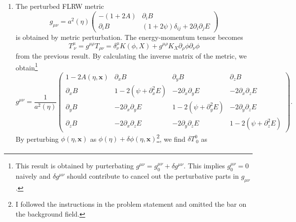\documentclass[a4paper,pdftex,10pt]{article}
\begin{document}
\begin{enumerate}
  \item
        The perturbed FLRW metric
        \begin{equation}
          g_{\mu\nu}
          =
          a^2(\eta)
          \begin{pmatrix}
            -(1+2A)       & \partial_{i}B                                   \\
            \partial_{i}B & (1+2\psi)\delta_{ij}+2\partial_{i}\partial_{j}E
          \end{pmatrix}
        \end{equation}
        is obtained by metric perturbation. The energy-momentum tensor becomes
        \begin{equation}
          T^{\mu}_{\ \nu}
          =
          g^{\mu\rho}T_{\rho\nu}
          =
          \delta^{\mu}_{\nu}K(\phi,X)
          +
          g^{\mu\rho}
          K_{X}
          \partial_{\rho}\phi\partial_{\nu}\phi
          \label{eqn:upperd_energy-momentum_tensor}
        \end{equation}
        from the previous result. By calculating the inverse matrix of the metric, we obtain\footnote{
          This result is obtained by purterbating $g^{\mu\nu}=g_{0}^{\mu\nu}+\delta g^{\mu\nu}$. This implies $g_{0}^{\mu\nu}=0$ naively and $\delta g^{\mu\nu}$ should contribute to cancel out the perturbative parts in $g_{\mu\nu}$.
        }
        \begin{equation}
          g^{\mu\nu}
          =
          \frac{1}{a^2(\eta)}
          \begin{pmatrix}
            1-2A(\eta,\bm{x}) & \partial_{x}B & \partial_{y}B & \partial_{z}B \\
            \partial_{x}B & 1-2(\psi+\partial_{x}^{2}E) & -2\partial_{x}\partial_{y}E & -2\partial_{x}\partial_{z}E \\
            \partial_{y}B & -2\partial_{x}\partial_{y}E & 1-2(\psi+\partial_{y}^{2}E) & -2\partial_{y}\partial_{z} E \\
            \partial_{z}B & -2\partial_{x}\partial_{z}E & -2\partial_{y}\partial_{z}E & 1-2(\psi+\partial_{z}^{2}E) 
          \end{pmatrix}
          .
        \end{equation}
        By perturbing $\phi(\eta,\bm{x})$ as $\phi(\eta)+\delta\phi(\eta,\bm{x})$\footnote{
          I followed the instructions in the problem statement and omitted the bar on the background field.
        }, we find $\delta T^{0}_{\ 0}$ as 
        \begin{align}

\end{align}
\end{enumerate}
\end{document}
